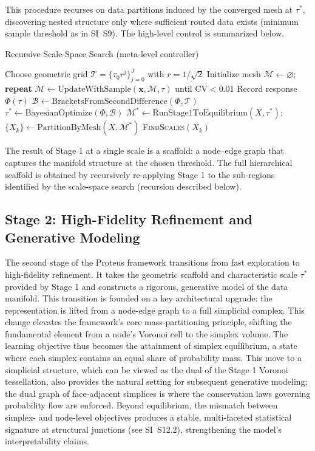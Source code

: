 \documentclass[11pt]{article}
\begin{document}
This procedure recurses on data partitions induced by the converged mesh at $\tau^*$, discovering nested structure only where sufficient routed data exists (minimum sample threshold as in SI~S9). The high-level control is summarized below.

\begin{algorithm}[h]
\caption{Recursive Scale-Space Search (meta-level controller)}
\label{alg:scalesearch}
\begin{algorithmic}[1]
    \State Choose geometric grid $\mathcal T = \{\tau_0 r^j\}_{j=0}^{J}$ with $r{=}1/\sqrt{2}$
        \State Initialize mesh $\mathcal M\leftarrow \varnothing$; \textbf{repeat} $\mathcal M \gets \text{UpdateWithSample}(\mathbf x, \mathcal M, \tau)$ until CV$<0.01$
        \State Record response $\Phi(\tau)$
    \EndFor
    \State $\mathcal B \gets \text{BracketsFromSecondDifference}(\Phi,\mathcal T)$
    \State $\tau^* \gets \text{BayesianOptimize}(\Phi, \mathcal B)$
    \State $\mathcal M^* \gets \text{RunStage1ToEquilibrium}(X, \tau^*)$; $\{X_k\} \gets \text{PartitionByMesh}(X, \mathcal M^*)$
            \State \textsc{FindScales}$(X_k)$ 
        \EndIf
    \EndFor
\EndProcedure
\end{algorithmic}
\end{algorithm}

The result of Stage 1 at a single scale is a scaffold: a node–edge graph that captures the manifold structure at the chosen threshold. The full hierarchical scaffold is obtained by recursively re-applying Stage 1 to the sub-regions identified by the scale-space search (recursion described below).

\subsection{Stage 2: High-Fidelity Refinement and Generative Modeling}
The second stage of the Proteus framework transitions from fast exploration to high-fidelity refinement. It takes the geometric scaffold and characteristic scale $\tau^*$ provided by Stage 1 and constructs a rigorous, generative model of the data manifold. This transition is founded on a key architectural upgrade: the representation is lifted from a node-edge graph to a full simplicial complex. This change elevates the framework's core mass-partitioning principle, shifting the fundamental element from a node's Voronoi cell to the simplex volume. The learning objective thus becomes the attainment of simplex equilibrium, a state where each simplex contains an equal share of probability mass. This move to a simplicial structure, which can be viewed as the dual of the Stage 1 Voronoi tessellation, also provides the natural setting for subsequent generative modeling; the dual graph of face-adjacent simplices is where the conservation laws governing probability flow are enforced. Beyond equilibrium, the mismatch between simplex- and node-level objectives produces a stable, multi-faceted statistical signature at structural junctions (see SI~S12.2), strengthening the model's interpretability claims.
\end{document}
